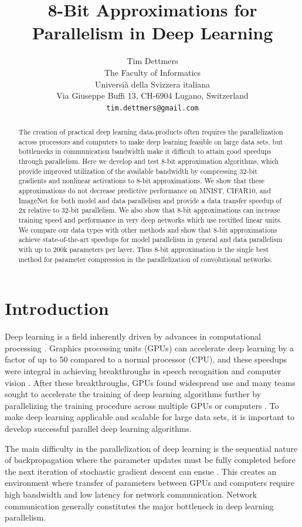 \documentclass{article} %
\title{8-Bit Approximations for Parallelism in Deep Learning}
\author{Tim Dettmers \\
The Faculty of Informatics\\
Universià della Svizzera italiana\\
Via Giuseppe Buffi 13, CH-6904 Lugano, Switzerland \\
\texttt{tim.dettmers@gmail.com} 
}
\begin{document}
\maketitle

\begin{abstract}
The creation of practical deep learning data-products often requires the parallelization across processors and computers to make deep learning feasible on large data sets, but bottlenecks in communication bandwidth make it difficult to attain good speedups through parallelism. Here we develop and test 8-bit approximation algorithms, which provide improved utilization of the available bandwidth by compressing 32-bit gradients and nonlinear activations to 8-bit approximations. We show that these approximations do not decrease predictive performance on MNIST, CIFAR10, and ImageNet for both model and data parallelism and provide a data transfer speedup of 2x relative to 32-bit parallelism. We also show that 8-bit approximations can increase training speed and performance in very deep networks which use rectified linear units. We compare our data types with other methods and show that 8-bit approximations achieve state-of-the-art speedups for model parallelism in general and data parallelism with up to 200k parameters per layer. Thus 8-bit approximation is the single best method for parameter compression in the parallelization of convolutional networks.
\end{abstract}

\section{Introduction}
Deep learning is a field inherently driven by advances in computational processing \citep{schmidhuber2015deep}. Graphics processing units (GPUs) can accelerate deep learning by a factor of up to 50 compared to a normal processor (CPU), and these speedups were integral in achieving breakthroughs in speech recognition and computer vision \citep{ciresan2012multi, dahl2012context,krizhevsky2012imagenet}. After these breakthroughs, GPUs found widespread use and many teams sought to accelerate the training of deep learning algorithms further by parallelizing the training procedure across multiple GPUs or computers \citep{chilimbi2014project,coates2013deep,dean2012large,wu2015deep}. To make deep learning applicable and scalable for large data sets, it is important to develop successful parallel deep learning algorithms.

The main difficulty in the parallelization of deep learning is the sequential nature of backpropagation where the parameter updates must be fully completed before the next iteration of stochastic gradient descent can ensue \citep{rumelhart1988learning}. This creates an environment where transfer of parameters between GPUs and computers require high bandwidth and low latency for network communication. Network communication generally constitutes the major bottleneck in deep learning parallelism.
\end{document}

